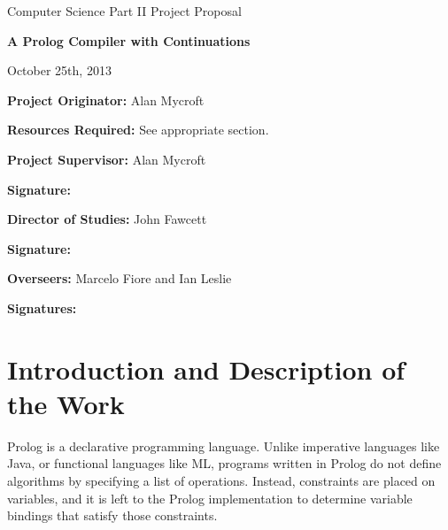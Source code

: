 \documentclass[12pt]{article}
\begin{document}

\newpage

\thispagestyle{empty}

\medskip
{}
\medskip
{}

\vfil

\centerline{\large Computer Science Part II Project Proposal}
\vspace{0.4in}
\centerline{\Large\bf A Prolog Compiler with Continuations}
\vspace{0.3in}
\centerline{\large October 25th, 2013}

\vfil

{\bf Project Originator:} Alan Mycroft

\vspace{0.1in}

{\bf Resources Required:} See appropriate section.

\vspace{0.5in}

{\bf Project Supervisor:} Alan Mycroft

\vspace{0.2in}

{\bf Signature:}

\vspace{0.5in}

{\bf Director of Studies:} John Fawcett

\vspace{0.2in}

{\bf Signature:}

\vspace{0.5in}

{\bf Overseers:} Marcelo Fiore and Ian Leslie

\vspace{0.2in}

{\bf Signatures:} 

\vfil
\eject


\section*{Introduction and Description of the Work}

Prolog is a declarative programming language. Unlike imperative languages like Java, or functional languages like ML, programs written in Prolog do not define algorithms by specifying a list of operations. Instead, constraints are placed on variables, and it is left to the Prolog implementation to determine variable bindings that satisfy those constraints. 
\end{document}
